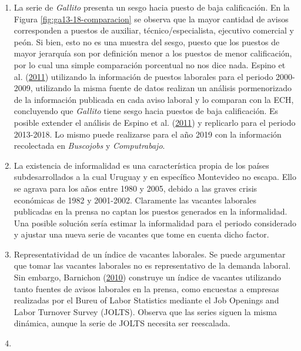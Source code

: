 \documentclass[12pt,oneside]{reedthesis}
\begin{document}
\begin{enumerate}
\item
  La serie de \emph{Gallito} presenta un sesgo hacia puesto de baja calificación. En la Figura \ref{fig:ga13-18-comparacion} se observa que la mayor cantidad de avisos corresponden a puestos de auxiliar, técnico/especialista, ejecutivo comercial y peón. Si bien, esto no es una muestra del sesgo, puesto que los puestos de mayor jerarquía son por definición menor a los puestos de menor calificación, por lo cual una simple comparación porcentual no nos dice nada. Espino et al. (\protect\hyperlink{ref-Alma2011}{2011}) utilizando la información de puestos laborales para el periodo 2000-2009, utilizando la misma fuente de datos realizan un análisis pormenorizado de la información publicada en cada aviso laboral y lo comparan con la ECH, concluyendo que \emph{Gallito} tiene sesgo hacia puestos de baja calificación. Es posible extender el análisis de Espino et al. (\protect\hyperlink{ref-Alma2011}{2011}) y replicarlo para el periodo 2013-2018. Lo mismo puede realizarse para el año 2019 con la información recolectada en \emph{Buscojobs} y \emph{Computrabajo}.
\item
  La existencia de informalidad es una característica propia de los países subdesarrollados a la cual Uruguay y en específico Montevideo no escapa. Ello se agrava para los años entre 1980 y 2005, debido a las graves crisis económicas de 1982 y 2001-2002. Claramente las vacantes laborales publicadas en la prensa no captan los puestos generados en la informalidad. Una posible solución sería estimar la informalidad para el periodo considerado y ajustar una nueva serie de vacantes que tome en cuenta dicho factor.
\item
  Representatividad de un índice de vacantes laborales. Se puede argumentar que tomar las vacantes laborales no es representativo de la demanda laboral. Sin embargo, Barnichon (\protect\hyperlink{ref-Barnichon2010}{2010}) construye un índice de vacantes utilizando tanto fuentes de avisos laborales en la prensa, como encuestas a empresas realizadas por el Bureu of Labor Statistics mediante el Job Openings and Labor Turnover Survey (JOLTS). Observa que las series siguen la misma dinámica, aunque la serie de JOLTS necesita ser reescalada.
\item

\end{enumerate}
\end{document}
